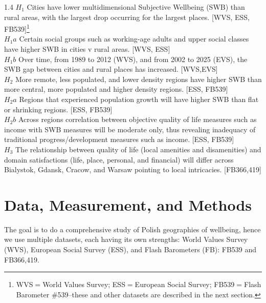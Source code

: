 \documentclass[10pt, letterpaper]{article}
\begin{document}
\begin{spacing}{1.4}
\noindent $H_1$ Cities have lower multidimensional Subjective Wellbeing (SWB) than rural areas, with the largest
drop occurring for the largest places. [WVS, ESS, FB539]\footnote{WVS$=$World Values
  Survey; ESS$=$European Social Survey; FB539$=$Flash Barometer \#539--these and other datasets are described
  in the next section.}\\ %
\indent$H_1a$ Certain social groups such as working-age adults and upper social classes
have higher SWB in cities v rural areas. [WVS, ESS]\\
\indent$H_1b$ Over time, from 1989 to 2012 (WVS), and from 2002 to 2025 (EVS), the SWB gap between cities and rural places has increased. [WVS,EVS]\\ 
$H_2$ More remote, less populated, and lower density regions have higher SWB than
more central, more populated and higher density regions. [ESS, FB539]\\ %
\indent$H_2a$ Regions that experienced population growth will have higher SWB than flat
or shrinking regions. [ESS, FB539]\\ 
\indent$H_2b$ Across regions correlation between objective quality of life measures such as income with
SWB measures will be moderate only,  %
thus revealing inadequacy of  traditional progress/development measures such as income. [ESS, FB539]\\
$H_3$ The relationship between quality of life (local amenities and disamenities) and domain satisfactions (life, place, personal, and financial) will differ across                                  
 Bialystok, Gdansk, Cracow, and Warsaw pointing to local intricacies. [FB366,419] %

 
 
\section{Data, Measurement, and Methods}

The goal is to do a comprehensive study of Polish geographies of wellbeing, hence
we use multiple datasets, each having its own strengths: World Values Survey (WVS), European Social Survey
(ESS), and Flash Barometers (FB): %
FB539 and %
FB366,419.


\end{spacing}
\end{document}
